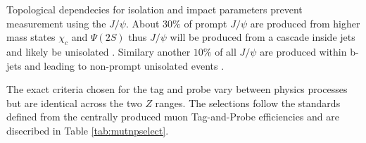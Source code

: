 

Topological dependecies for isolation and impact parameters prevent measurement using the $J/\psi$. About $30\%$ of prompt $J/\psi$ are produced from higher mass states $\chi_c$ and $\Psi(2S)$ thus $J/\psi$ will be produced from a cascade inside jets and likely be unisolated \cite{Lansberg:2006dh}. Similary another $10\%$ of all $J/\psi$ are produced within b-jets and leading to  non-prompt  unisolated events \cite{LHCb:2013itw}.

The exact criteria chosen for the tag and probe vary between physics processes but are identical across the two $Z$ ranges. The selections follow the standards defined from the centrally produced muon Tag-and-Probe efficiencies and are disecribed in Table \ref{tab:mutnpselect}.\\

